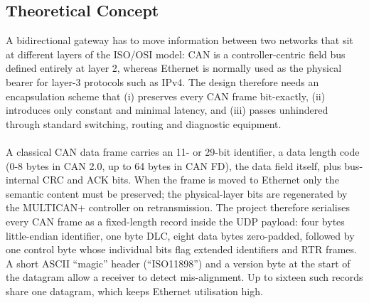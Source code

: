 \subsection{Theoretical Concept }
A bidirectional gateway has to move information between two networks that sit at different layers of the ISO/OSI model: CAN is a controller-centric field bus defined entirely at layer 2, whereas Ethernet is normally used as the physical bearer for layer-3 protocols such as IPv4. The design therefore needs an encapsulation scheme that (i) preserves every CAN frame bit-exactly, (ii) introduces only constant and minimal latency, and (iii) passes unhindered through standard switching, routing and diagnostic equipment.\\\\
A classical CAN data frame carries an 11- or 29-bit identifier, a data length code (0-8 bytes in CAN 2.0, up to 64 bytes in CAN FD), the data field itself, plus bus-internal CRC and ACK bits. When the frame is moved to Ethernet only the semantic content must be preserved; the physical-layer bits are regenerated by the MULTICAN+ controller on retransmission. The project therefore serialises every CAN frame as a fixed-length record inside the UDP payload: four bytes little-endian identifier, one byte DLC, eight data bytes zero-padded, followed by one control byte whose individual bits flag extended identifiers and RTR frames. A short ASCII “magic” header (“ISO11898”) and a version byte at the start of the datagram allow a receiver to detect mis-alignment. Up to sixteen such records share one datagram, which keeps Ethernet utilisation high.

